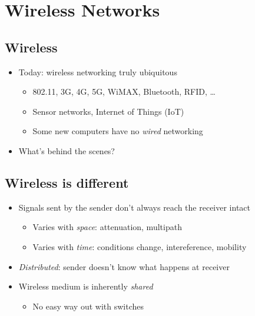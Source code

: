 \section{Wireless Networks}
\subsection{Wireless}
\begin{itemize}[nosep]
    \item Today: wireless networking truly ubiquitous
          \begin{itemize}[nosep]
              \item 802.11, 3G, 4G, 5G, WiMAX, Bluetooth, RFID, \dots
              \item Sensor networks, Internet of Things (IoT)
              \item Some new computers have no \emph{wired} networking
          \end{itemize}
    \item What's behind the scenes?
\end{itemize}

\subsection{Wireless is different}
\begin{itemize}[nosep]
    \item Signals sent by the sender don't always reach the receiver intact
          \begin{itemize}[nosep]
              \item Varies with \emph{space}: attenuation, multipath
              \item Varies with \emph{time}: conditions change, intereference, mobility
          \end{itemize}
    \item \emph{Distributed}: sender doesn't know what happens at receiver
    \item Wireless medium is inherently \emph{shared}
          \begin{itemize}[nosep]
              \item No easy way out with switches
          \end{itemize}
\end{itemize}

